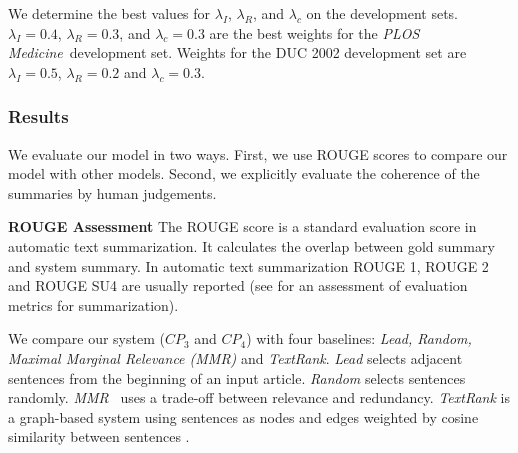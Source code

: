  We determine the best values for $\lambda_{I}$, $\lambda_R$, and $\lambda_{c}$ on the development sets. $\lambda_{I}=0.4$, $\lambda_R=0.3$, and $\lambda_{c}=0.3$ are the best weights for the \emph{PLOS Medicine}\ development set. Weights for the DUC 2002 development set are $\lambda_{I}=0.5$, $\lambda_R=0.2$ and $\lambda_{c}=0.3$.

\subsubsection{Results}
We evaluate our model in two ways. First, we use ROUGE scores to compare our model with other models. Second, we explicitly evaluate the coherence of the summaries by human judgements.

\textbf{ROUGE Assessment}
\noindent
The ROUGE score \cite{linchinyew04} is a standard evaluation score in automatic text summarization. It calculates the overlap between gold summary and system summary. In automatic text summarization ROUGE 1, ROUGE 2 and ROUGE SU4 are usually reported (see  for an assessment of evaluation metrics for summarization).


We compare our system (\emph{$CP_3$} and \emph{$CP_4$}) with four baselines: \emph{Lead, Random, Maximal Marginal Relevance (MMR)} and \emph{Text\-Rank}. \emph{Lead} selects adjacent sentences from the beginning of an input article. \emph{Random} selects sentences randomly. \emph{MMR}\ \cite{carbonell98} uses a trade-off between relevance and redundancy. \emph{Text\-Rank} is a graph-based system using sentences as nodes and edges weighted by cosine similarity between sentences \cite{mihalcea04b}.

